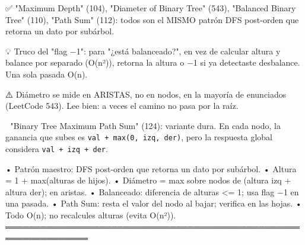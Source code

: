 \begin{dsaentrevistas}

✅ "Maximum Depth" (104), "Diameter of Binary Tree" (543), "Balanced
   Binary Tree" (110), "Path Sum" (112): todos son el MISMO patrón DFS
   post-orden que retorna un dato por subárbol.

💡 Truco del "flag −1": para "¿está balanceado?", en vez de calcular
   altura y balance por separado (O(n²)), retorna la altura o −1 si ya
   detectaste desbalance. Una sola pasada O(n).

⚠️ Diámetro se mide en ARISTAS, no en nodos, en la mayoría de enunciados
   (LeetCode 543). Lee bien: a veces el camino no pasa por la raíz.

🔑 "Binary Tree Maximum Path Sum" (124): variante dura. En cada nodo, la
   ganancia que subes es \verb|val + max(0, izq, der)|, pero la respuesta
   global considera \verb|val + izq + der|.

\end{dsaentrevistas}

\begin{dsaresumen}

• Patrón maestro: DFS post-orden que retorna un dato por subárbol.
• Altura = 1 + max(alturas de hijos).
• Diámetro = max sobre nodos de (altura izq + altura der); en aristas.
• Balanceado: diferencia de alturas <= 1; usa flag −1 en una pasada.
• Path Sum: resta el valor del nodo al bajar; verifica en las hojas.
• Todo O(n); no recalcules alturas (evita O(n²)).
════════════════════════════════════════════════════════════════

\end{dsaresumen}
